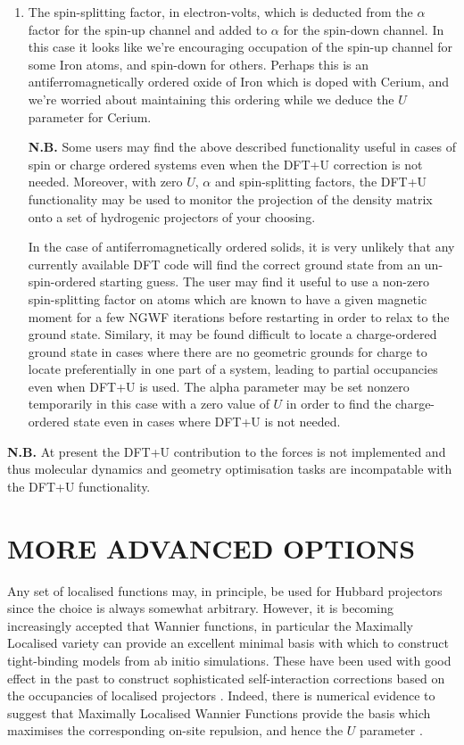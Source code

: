 \documentclass[a4paper,oneside,11pt]{article}
\numberwithin{equation}{section}
\begin{document}
\begin{enumerate}
\item The spin-splitting factor, in electron-volts, which is
deducted from the $\alpha$ factor for the spin-up channel and added
to $\alpha$ for the spin-down channel. In this case it looks like we're 
encouraging occupation of the spin-up channel for some Iron atoms, and 
spin-down for others. Perhaps this is an antiferromagnetically ordered
oxide of Iron which is doped with Cerium, and we're worried about maintaining
this ordering while we deduce the $U$ parameter for Cerium.

\textbf{N.B.} Some users may find the above described functionality useful in 
cases of spin or charge ordered systems even when the DFT+U correction
is not needed. Moreover, with zero $U$, $\alpha$ and spin-splitting 
factors, the DFT+U functionality may be used to monitor the projection
of the density matrix onto a set of hydrogenic projectors of your choosing.

In the case of antiferromagnetically ordered solids,
it is very unlikely that any currently available DFT code will find 
the correct ground state from an un-spin-ordered starting guess. 
The user may find it useful to use a non-zero 
spin-splitting factor on atoms which are known to have a given magnetic moment for a few NGWF iterations before restarting in order 
to relax to the ground state.
Similary, it may be found difficult to locate a charge-ordered ground state
in cases where there are no geometric grounds for charge to locate preferentially
in one part of a system, leading to partial occupancies even when DFT+U is
used. The alpha parameter may be set nonzero temporarily in this case with a zero value
of $U$ in order to find the charge-ordered state even in cases where DFT+U is
not needed.
\end{enumerate}

\textbf{N.B.} At present the DFT+U contribution to the forces is not implemented
and thus molecular dynamics and geometry optimisation tasks are incompatable
with the DFT+U functionality.

\section*{MORE ADVANCED OPTIONS}

Any set of localised functions may, in principle, be used for Hubbard projectors since the
choice is always somewhat arbitrary. However, it is becoming increasingly accepted
that Wannier functions, in particular the Maximally Localised variety \cite{Marzari, Souza}
can provide an excellent minimal basis with which to construct tight-binding models from ab 
initio simulations. These have been used with good effect in the past to construct sophisticated
self-interaction corrections based on the occupancies of localised projectors \cite{Mazurenko, Lechermann}.
Indeed, there is numerical evidence to suggest that Maximally Localised Wannier Functions provide
the basis which maximises the corresponding on-site repulsion, and hence the $U$ parameter \cite{Miyake}.
\end{document}
